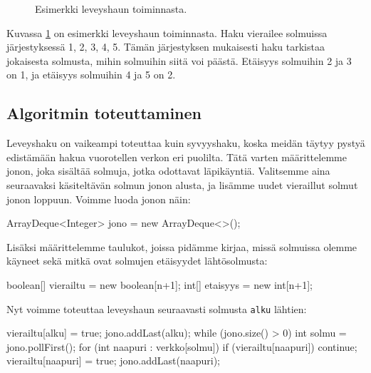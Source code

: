 \begin{figure}
\begin{center}
\end{center}
\caption{Esimerkki leveyshaun toiminnasta.}
\label{fig:levhak}
\end{figure}

Kuvassa \ref{fig:levhak} on esimerkki leveyshaun toiminnasta.
Haku vierailee solmuissa järjestyksessä 1, 2, 3, 4, 5.
Tämän järjestyksen mukaisesti haku tarkistaa jokaisesta solmusta,
mihin solmuihin siitä voi päästä.
Etäisyys solmuihin 2 ja 3 on 1, ja etäisyys solmuihin 4 ja 5 on 2.

\subsection{Algoritmin toteuttaminen}

Leveyshaku on vaikeampi toteuttaa kuin syvyyshaku,
koska meidän täytyy pystyä edistämään hakua vuorotellen verkon eri puolilta.
Tätä varten määrit\-telemme jonon, joka sisältää solmuja,
jotka odottavat läpikäyntiä.
Valitsemme aina seuraavaksi käsiteltävän solmun jonon alusta,
ja lisämme uudet vieraillut solmut jonon loppuun.
Voimme luoda jonon näin:

\begin{code}
ArrayDeque<Integer> jono = new ArrayDeque<>();
\end{code}

Lisäksi määrittelemme taulukot, joissa pidämme kirjaa,
missä solmuissa olemme käyneet sekä mitkä ovat solmujen
etäisyydet lähtösolmusta:

\begin{code}
boolean[] vierailtu = new boolean[n+1];
int[] etaisyys = new int[n+1];
\end{code}

Nyt voimme toteuttaa leveyshaun seuraavasti solmusta \texttt{alku} lähtien:

\begin{code}
vierailtu[alku] = true;
jono.addLast(alku);
while (jono.size() > 0) {
    int solmu = jono.pollFirst();
    for (int naapuri : verkko[solmu]) {
        if (vierailtu[naapuri]) continue;
        vierailtu[naapuri] = true;
        jono.addLast(naapuri);
    }
}
\end{code}

